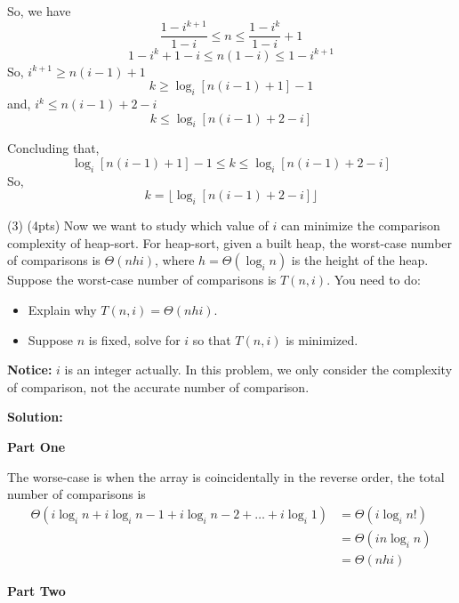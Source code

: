 \documentclass[10.5pt]{article}
\begin{document}
So, we have $$\frac{1-i^{k+1}}{1-i}\leq n\leq \frac{1-i^{k}}{1-i}+1$$
$$1-i^k+1-i\leq n(1-i)\leq 1-i^{k+1}$$
So, $i^{k+1}\geq n(i-1)+1$
$$k\geq \log_i[n(i-1)+1]-1$$
and, $i^{k}\leq n(i-1)+2-i$
$$k\leq \log_i[n(i-1)+2-i]$$

Concluding that, $$\log_i[n(i-1)+1]-1\leq k\leq\log_i[n(i-1)+2-i]$$
So, $$k=\lfloor \log_i[n(i-1)+2-i]\rfloor$$

\newpage
(3) (4pts) Now we want to study which value of $i$ can minimize the comparison complexity of heap-sort. For heap-sort, given a built heap, the worst-case number of comparisons is $\Theta(nhi)$, where $h=\Theta(\log_in)$ is the height of the heap. Suppose the worst-case number of comparisons is $T(n,i)$. You need to do:

\begin{itemize}
    \item{Explain why $T(n,i) = \Theta(nhi)$.}
    \item{Suppose $n$ is fixed, solve for $i$ so that $T(n,i)$ is minimized.}
\end{itemize}

\textbf{Notice: } $i$ is an integer actually. In this problem, we only consider the complexity of comparison, not the accurate number of comparison.

\textbf{Solution:}

\textbf{Part One}

The worse-case is when the array is coincidentally in the reverse order, the total number of  comparisons is
\begin{align*}
    \Theta(i\log_i{n}+i\log_i{n-1}+i\log_i{n-2}+\dots+i\log_i{1}) & =\Theta(i\log_i{n!}) \\
                                                                  & =\Theta(in\log_in)   \\
                                                                  & =\Theta(nhi)
\end{align*}

\textbf{Part Two}
\end{document}
